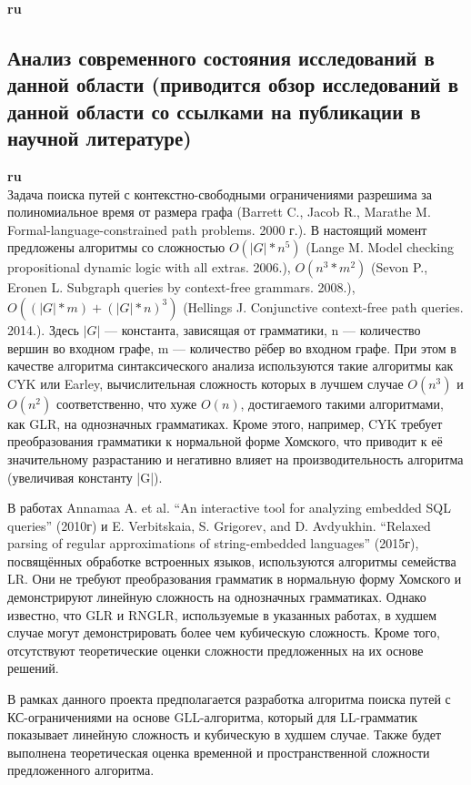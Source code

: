 \documentclass[12pt]{article}  %
\theoremstyle{remark}
\begin{document}
\textbf{ru}\\


\subsection{Анализ современного состояния исследований в данной области (приводится обзор исследований в данной области со ссылками на публикации в научной литературе)}

\textbf{ru}\\
Задача поиска путей с контекстно-свободными ограничениями разрешима за полиномиальное время от размера графа (Barrett C., Jacob R., Marathe M. Formal-language-constrained path problems. 2000 г.). В настоящий момент предложены алгоритмы со сложностью $O(|G|*n^5)$ (Lange M. Model checking propositional dynamic logic with all extras. 2006.), $O(n^3*m^2)$ (Sevon P., Eronen L. Subgraph queries by context-free grammars. 2008.), $O((|G|*m) + (|G|*n)^3)$ (Hellings J. Conjunctive context-free path queries. 2014.). Здесь $|G|$ — константа, зависящая от грамматики, n — количество вершин во входном графе, m — количество рёбер во входном графе. При этом в качестве алгоритма синтаксического анализа используются такие алгоритмы как CYK или Earley, вычислительная сложность которых в лучшем случае $O(n^3)$ и $O(n^2)$ соответственно, что хуже $O(n)$, достигаемого такими алгоритмами, как GLR, на однозначных грамматиках. Кроме этого, например, CYK требует преобразования грамматики к нормальной форме Хомского, что приводит к её значительному разрастанию и негативно влияет на производительность алгоритма (увеличивая константу |G|).

В работах Annamaa A. et al. “An interactive tool for analyzing embedded SQL queries” (2010г) и E. Verbitskaia, S. Grigorev, and D. Avdyukhin. “Relaxed parsing of regular approximations of string-embedded languages” (2015г), посвящённых обработке встроенных языков, используются алгоритмы семейства LR. Они не требуют преобразования грамматик в нормальную форму Хомского и демонстрируют линейную сложность на однозначных грамматиках. Однако известно, что GLR и RNGLR, используемые в указанных работах, в худшем случае могут демонстрировать более чем кубическую сложность. Кроме того, отсутствуют теоретические оценки сложности предложенных на их основе решений.

В рамках данного проекта предполагается разработка алгоритма поиска путей с КС-ограничениями на основе GLL-алгоритма, который для LL-грамматик показывает линейную сложность и кубическую в худшем случае. Также будет выполнена теоретическая оценка временной и пространственной сложности предложенного алгоритма.
\end{document}
